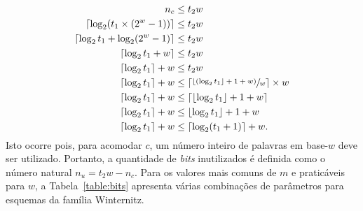 \documentclass{ufsctex/ufsctex}
\begin{document}
\begin{align}
  \begin{split}
    n_{c} &\leq t_{2} w \\
    \lceil \log_2 (t_{1} \times (2^{w} - 1)) \rceil &\leq t_{2}w \\
    \lceil \log_2 t_{1} + \log_2 (2^{w} - 1) \rceil &\leq t_{2}w \\
    \lceil \log_2 t_{1} + w \rceil &\leq t_{2}w \\
    \lceil \log_2 t_{1} \rceil + w &\leq t_{2}w \\
    \lceil \log_2 t_{1} \rceil + w &\leq \left\lceil
      \sfrac{\lfloor (\log_2 t_{1} \rfloor + 1 + w)}{w} \right\rceil \times w \\
    \lceil \log_2 t_{1} \rceil + w
      &\leq \lceil \lfloor \log_2 t_{1} \rfloor + 1 + w \rceil \\
    \lceil \log_2 t_{1} \rceil + w &\leq \lfloor \log_2 t_{1} \rfloor + 1 + w \\
    \lceil \log_2 t_{1} \rceil + w &\leq \lceil \log_2 (t_{1} + 1) \rceil + w.
  \end{split}
\end{align}
Isto ocorre pois, para acomodar $c$, um número inteiro de palavras em base-$w$
deve ser utilizado. Portanto, a quantidade de \emph{bits} inutilizados é
definida como o número natural $n_{u} = t_{2}w - n_{c}$. Para os valores mais
comuns de $m$ e praticáveis para $w$, a Tabela~\ref{table:bits} apresenta
várias combinações de parâmetros para esquemas da família Winternitz.
\end{document}
